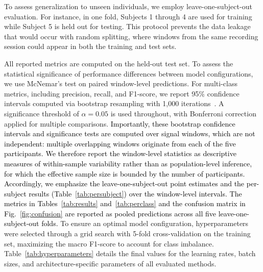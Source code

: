 \documentclass[pdflatex,sn-nature,iicol]{sn-jnl}
\newcommand{\rev}[1]{\textcolor{black}{#1}}
\begin{document}
To assess generalization to unseen individuals, we employ leave-one-subject-out evaluation. For instance, in one fold, Subjects 1 through 4 are used for training while Subject 5 is held out for testing. This protocol prevents the data leakage that would occur with random splitting, where windows from the same recording session could appear in both the training and test sets.

All reported metrics are computed on the held-out test set. To assess the statistical significance of performance differences between model configurations, we use McNemar's test on paired window-level predictions. For multi-class metrics, including precision, recall, and F1-score, we report 95\% confidence intervals computed via bootstrap resampling with 1,000 iterations~\cite{lehmann2006testing}. A significance threshold of $\alpha = 0.05$ is used throughout, with Bonferroni correction applied for multiple comparisons. \rev{Importantly, these bootstrap confidence intervals and significance tests are computed over signal windows, which are not independent: multiple overlapping windows originate from each of the five participants. We therefore report the window-level statistics as descriptive measures of within-sample variability rather than as population-level inference, for which the effective sample size is bounded by the number of participants. Accordingly, we emphasize the leave-one-subject-out point estimates and the per-subject results (Table~\ref{tab:persubject}) over the window-level intervals.} \rev{The metrics in Tables~\ref{tab:results} and~\ref{tab:perclass} and the confusion matrix in Fig.~\ref{fig:confusion} are reported as pooled predictions across all five leave-one-subject-out folds.} To ensure an optimal model configuration, hyperparameters were selected through a grid search with 5-fold cross-validation on the training set, maximizing the macro F1-score to account for class imbalance. Table~\ref{tab:hyperparameters} details the final values for the learning rates, batch sizes, and architecture-specific parameters of all evaluated methods.
\end{document}
